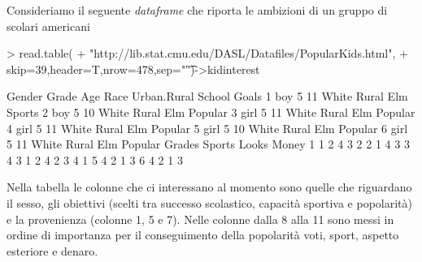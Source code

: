 \documentclass[onecolumn,11pt]{book}
\begin{document}
Consideriamo il seguente \emph{dataframe} che riporta le ambizioni di un gruppo di scolari americani   
\begin{Schunk}
\begin{Sinput}
> read.table(
+ "http://lib.stat.cmu.edu/DASL/Datafiles/PopularKids.html",
+ skip=39,header=T,nrow=478,sep="\t")->kidinterest
\end{Sinput}
\end{Schunk}
\begin{Schunk}
\begin{Soutput}
  Gender Grade Age  Race Urban.Rural School   Goals
1    boy     5  11 White       Rural    Elm  Sports
2    boy     5  10 White       Rural    Elm Popular
3   girl     5  11 White       Rural    Elm Popular
4   girl     5  11 White       Rural    Elm Popular
5   girl     5  10 White       Rural    Elm Popular
6   girl     5  11 White       Rural    Elm Popular
  Grades Sports Looks Money
1      1      2     4     3
2      2      1     4     3
3      4      3     1     2
4      2      3     4     1
5      4      2     1     3
6      4      2     1     3
\end{Soutput}
\end{Schunk}
Nella tabella le colonne che ci interessano al momento sono quelle che riguardano il sesso, gli obiettivi (scelti tra successo scolastico, capacit\`a sportiva e popolarit\`a) e la provenienza (colonne 1, 5  e 7). Nelle colonne dalla 8 alla 11 sono messi in ordine di importanza per il conseguimento della popolarit\`a  voti, sport, aspetto esteriore e denaro.
\end{document}
